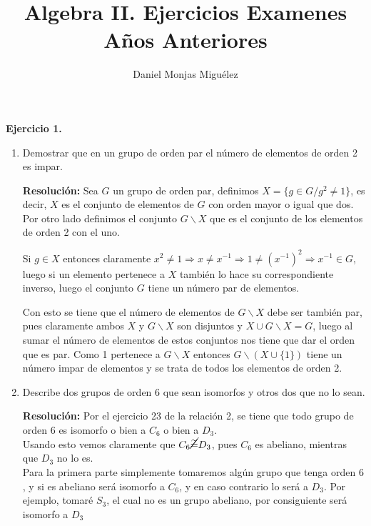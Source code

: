 \documentclass{article}
\title{Algebra II. Ejercicios Examenes Años Anteriores}
\author{Daniel Monjas Miguélez}
\begin{document}
\maketitle
\newpage
\textbf{Ejercicio 1.}\begin{enumerate}
\item Demostrar que en un grupo de orden par el número de elementos de orden 2 es impar.

\textbf{Resolución:} Sea $G$ un grupo de orden par, definimos $X=\{g\in G/g^2\neq 1\}$, es decir, $X$ es el conjunto de elementos de $G$ con orden mayor o igual que dos. Por otro lado definimos el conjunto $G\backslash X$ que es el conjunto de los elementos de orden 2 con el uno.

Si $g\in X$ entonces claramente $x^2\neq 1\Rightarrow x\neq x^{-1}\Rightarrow 1\neq (x^{-1})^2\Rightarrow x^{-1}\in G$, luego si un elemento pertenece a $X$ también lo hace su correspondiente inverso, luego el conjunto $G$ tiene un número par de elementos. 

Con esto se tiene que el número de elementos de $G\backslash X$ debe ser también par, pues claramente ambos $X$ y $G\backslash X$ son disjuntos y $X\cup G\backslash X=G$, luego al sumar el número de elementos de estos conjuntos nos tiene que dar el orden que es par. Como 1 pertenece a $G\backslash X$ entonces $G\backslash (X\cup \{1\})$ tiene un número impar de elementos y se trata de todos los elementos de orden 2.

\item Describe dos grupos de orden 6 que sean isomorfos y otros dos que no lo sean.

\textbf{Resolución:} Por el ejercicio 23 de la relación 2, se tiene que todo grupo de orden 6 es isomorfo o bien a $C_6$ o bien a $D_3$. \\

Usando esto vemos claramente que $C_6\cancel{\overset{\sim}{=}} D_3$, pues $C_6$ es abeliano, mientras que $D_3$ no lo es. \\

Para la primera parte simplemente tomaremos algún grupo que tenga orden $6$, y si es abeliano será isomorfo a $C_6$, y en caso contrario lo será a $D_3$. Por ejemplo, tomaré $S_3$, el cual no es un grupo abeliano, por consiguiente será isomorfo a $D_3$

\end{enumerate}
\end{document}
